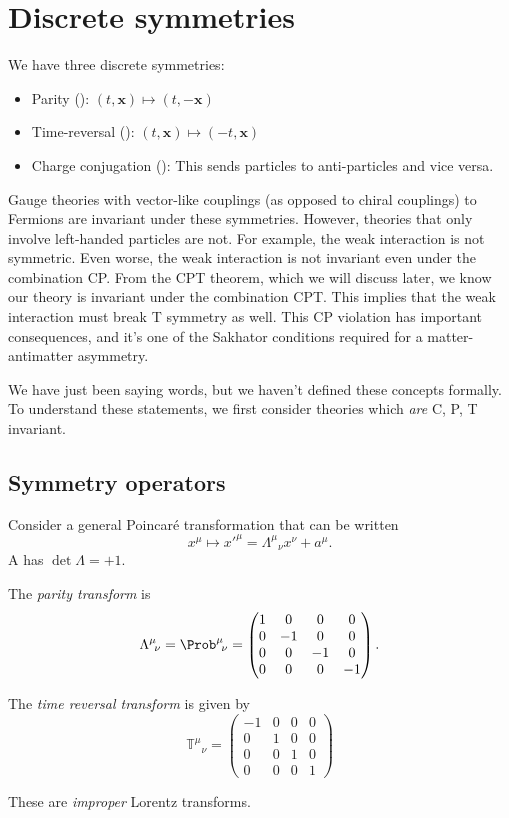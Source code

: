 \documentclass[a4paper]{article}
\begin{document}
\section{Discrete symmetries}
We have three discrete symmetries:
\begin{itemize}
  \item Parity (): $(t, \mathbf{x}) \mapsto (t, -\mathbf{x})$
  \item Time-reversal (): $(t, \mathbf{x}) \mapsto (-t, \mathbf{x})$
  \item Charge conjugation (): This sends particles to anti-particles and vice versa.
\end{itemize}
Gauge theories with vector-like couplings (as opposed to chiral couplings) to Fermions are invariant under these symmetries. However, theories that only involve left-handed particles are not. For example, the weak interaction is not symmetric. Even worse, the weak interaction is not invariant even under the combination CP. From the CPT theorem, which we will discuss later, we know our theory is invariant under the combination CPT. This implies that the weak interaction must break T symmetry as well. This CP violation has important consequences, and it's one of the Sakhator conditions required for a matter-antimatter asymmetry.

We have just been saying words, but we haven't defined these concepts formally. To understand these statements, we first consider theories which \emph{are} C, P, T invariant.

\subsection{Symmetry operators}
Consider a general Poincar\'e transformation that can be written
\[
  x^\mu \mapsto x'^\mu = \Lambda^\mu\!_\nu x^\nu + a^\mu.
\]
A  has $\det \Lambda = +1$.
\begin{defi}
  The \emph{parity transform} is
  \[
    \Lambda^\mu\!_\nu = \Prob^\mu\!_\nu =
    \begin{pmatrix}
      1 & 0 & 0 & 0\\
      0 & -1 & 0 & 0\\
      0 & 0 & -1 & 0\\
      0 & 0 & 0 & -1
    \end{pmatrix}.
  \]
\end{defi}

\begin{defi}
  The \emph{time reversal transform} is given by
  \[
    \mathbb{T}^\mu\!_\nu =
    \begin{pmatrix}
      -1 & 0 & 0 & 0\\
      0 & 1 & 0 & 0\\
      0 & 0 & 1 & 0\\
      0 & 0 & 0 & 1
    \end{pmatrix}
  \]
\end{defi}
These are \emph{improper} Lorentz transforms.
\end{document}
